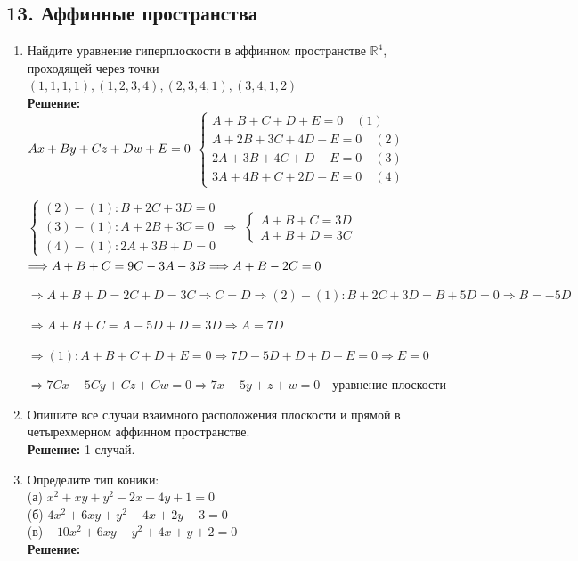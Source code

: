 \documentclass[]{book}
\theoremstyle{definition}
\newcommand{\bb}[1]{\mathbb{#1}}
\begin{document}
\subsection*{13. Аффинные пространства}

\begin{enumerate}[resume]

\item Найдите уравнение гиперплоскости в аффинном пространстве $\bb{R}^4$, проходящей через точки \\ $(1,1,1,1),(1,2,3,4),(2,3,4,1),(3,4,1,2)$\\
\textbf{Решение:}\\
$Ax+By+Cz+Dw+E = 0\\$
$\begin{cases}
   A+B+C+D+E=0 \quad (1) \\
   A+2B+3C+4D+E=0\quad (2) \\
   2A+3B+4C+D+E=0\quad (3) \\
   3A+4B+C+2D+E=0\quad (4)
 \end{cases}$
 
$\begin{cases}
(2)-(1)\colon B+2C+3D = 0 \\
(3)-(1)\colon A+2B+3C=0 \\
(4)-(1)\colon 2A+3B+D=0
 \end{cases}
\Longrightarrow$
$\begin{cases}
A+B+C=3D \\
A+B+D=3C
 \end{cases}$
$\Longrightarrow A+B+C=9C-3A-3B\\
\Longrightarrow A+B-2C = 0$

$\Longrightarrow A+B+D = 2C+D=3C \Longrightarrow C=D \Longrightarrow (2)-(1): B+2C+3D = B +5D = 0 \Longrightarrow B = -5D$

$\Longrightarrow A+B+C=A-5D+D = 3D \Longrightarrow A = 7D$

$\Longrightarrow (1): A+B+C+D+E = 0 \Longrightarrow 7D-5D+D+D+E=0 \Longrightarrow E=0$

$\Longrightarrow 7Cx-5Cy+Cz+Cw=0 \Longrightarrow 7x-5y+z+w=0$ - уравнение плоскости


\item Опишите все случаи взаимного расположения плоскости и прямой в четырехмерном аффинном пространстве.\\
\textbf{Решение:}
1 случай.


\item Определите тип коники:\\
(а) $x^2+xy+y^2-2x-4y+1=0$\\
(б) $4x^2+6xy+y^2-4x+2y+3=0$\\
(в) $-10x^2+6xy-y^2+4x+y+2=0$\\
\textbf{Решение:}\\



\end{enumerate}
\end{document}
